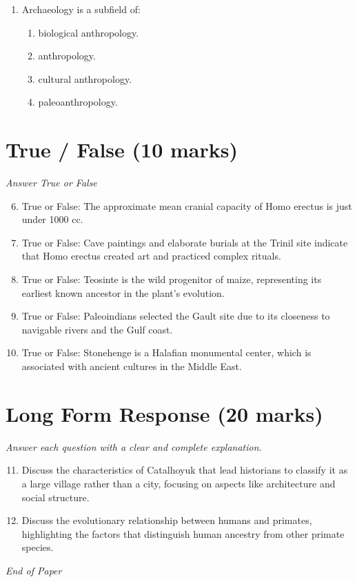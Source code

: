 \documentclass[12pt]{article}
\begin{document}
\begin{enumerate}[label=\arabic*.]
\begin{enumerate}[label=(\alph*)]
    \item happened everywhere except in South America.
    \item took thousands of years.
    \item took hundreds of thousands of years.
    \item always required careful planning.
\end{enumerate}
\item Archaeology is a subfield of:
\begin{enumerate}[label=(\alph*)]
    \item biological anthropology.
    \item anthropology.
    \item cultural anthropology.
    \item paleoanthropology.
\end{enumerate}
\end{enumerate}

\section*{True / False (10 marks)}
\textit{Answer True or False}
\begin{enumerate}[label=\arabic*.]
\setcounter{enumi}{5}
\item True or False: The approximate mean cranial capacity of Homo erectus is just under 1000 cc.
\item True or False: Cave paintings and elaborate burials at the Trinil site indicate that Homo erectus created art and practiced complex rituals.
\item True or False: Teosinte is the wild progenitor of maize, representing its earliest known ancestor in the plant's evolution.
\item True or False: Paleoindians selected the Gault site due to its closeness to navigable rivers and the Gulf coast.
\item True or False: Stonehenge is a Halafian monumental center, which is associated with ancient cultures in the Middle East.
\end{enumerate}

\section*{Long Form Response (20 marks)}
\textit{Answer each question with a clear and complete explanation.}
\begin{enumerate}[label=\arabic*.]
\setcounter{enumi}{10}
\item Discuss the characteristics of Catalhoyuk that lead historians to classify it as a large village rather than a city, focusing on aspects like architecture and social structure.
\item Discuss the evolutionary relationship between humans and primates, highlighting the factors that distinguish human ancestry from other primate species.
\end{enumerate}

\vfill
\noindent\textit{End of Paper}
\end{document}
